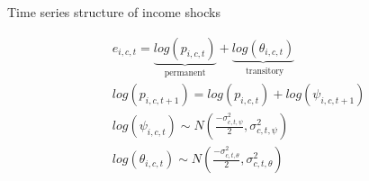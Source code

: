 \documentclass{beamer}
\begin{document}
\begin{frame}{Time series structure of income shocks}

\begin{equation*}
	\begin{split}
& e_{i,c,t} = \underbrace{log (p_{i,c,t})}_{\text{permanent}} + \underbrace{log(\theta_{i,c,t})}_{\text{ transitory}} \\
& log (p_{i,c,t+1}) = log(p_{i,c,t}) + log (\psi_{i,c,t+1}) \\
& log (\psi_{i,c,t}) \sim N(\frac{-\sigma^2_{c,t,\psi}}{2},\sigma^2_{c,t,\psi}) \\
 & log (\theta_{i,c,t}) \sim N(\frac{-\sigma^2_{c,t,\theta}}{2},\sigma^2_{c,t,\theta}) \\
\end{split} 
	\end{equation*}


\end{frame}
\end{document}
